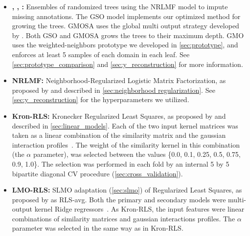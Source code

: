 \begin{itemize}
    \item \textbf{, , :} Ensembles of randomized trees using the NRLMF model to impute missing annotations. The GSO model implements our optimized method for growing the trees. GMOSA uses the global multi output strategy developed by . Both GSO and GMOSA grows the trees to their maximum depth. GMO uses the weighted-neighbors prototype we developed in \autoref{sec:prototype}, and enforces at least 5 samples of each domain in each leaf. See \autoref{sec:prototype_comparison} and \autoref{sec:y_reconstruction} for more information.

    \item \textbf{NRLMF:} Neighborhood-Regularized Logistic Matrix Factorization, as proposed by  and described in \autoref{sec:neighborhood regularization}. See \autoref{sec:y_reconstruction} for the hyperparameters we utilized.

    \item \textbf{Kron-RLS:} Kronecker Regularized Least Squares, as proposed by  and described in \autoref{sec:linear_models}.
    Each of the two input kernel matrices was taken as a linear combination of the similarity matrix and the gaussian interaction profiles~\cite{vanlaarhoven2011gaussian}. %
    The weight of the similarity kernel in this combination (the $\alpha$ parameter), was selected between the values \{0.0, 0.1, 0.25, 0.5, 0.75, 0.9, 1.0\}.
    The selection was performed in each fold by an internal 5 by 5 bipartite diagonal CV procedure (\autoref{sec:cross_validation}).

    \item \textbf{LMO-RLS:} SLMO adaptation (\autoref{sec:slmo}) of Regularized Least Squares, as proposed by  as RLS-avg. Both the primary and secondary models were multi-output kernel Ridge regressors~\cite[p.~492-493]{murphy2012machine}. 
    As Kron-RLS, the input features were linear combinations of similarity matrices and gaussian interactions profiles. The $\alpha$ parameter was selected in the same way as in Kron-RLS.


\end{itemize}
